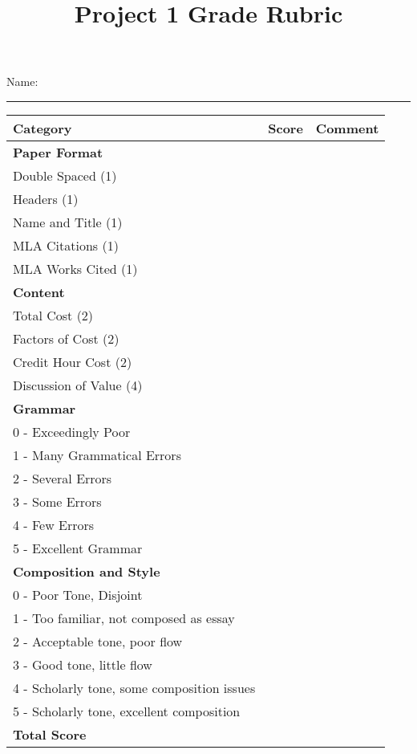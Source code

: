 \documentclass{article}
\title{Project 1 Grade Rubric}
\author{}
\date{}
\begin{document}
    \maketitle

    Name: \rule{5in}{0.25pt}
    \newline
    \newline
    \begin{tabular}{|l|l|l|}
        \hline
        \textbf{Category} & \textbf{Score} & \textbf{Comment} \\
        \hline
        \rule{0in}{0.25in}\textbf{Paper Format} & \hspace{0.25in} & \hspace{3in} \\
        Double Spaced (1) & & \\
        Headers (1) & & \\
        Name and Title (1) & & \\
        MLA Citations (1) & & \\
        MLA Works Cited (1) & & \\
        \hline
        \textbf{Content} & & \\
        Total Cost (2) & & \\
        Factors of Cost (2) & & \\
        Credit Hour Cost (2) & & \\
        Discussion of Value (4) & & \\
        \hline
        \textbf{Grammar} & & \\
        0 - Exceedingly Poor & & \\
        1 - Many Grammatical Errors & & \\
        2 - Several Errors & & \\
        3 - Some Errors & & \\
        4 - Few Errors & & \\
        5 - Excellent Grammar & & \\
        \hline
        \textbf{Composition and Style} & & \\
        0 - Poor Tone, Disjoint & & \\
        1 - Too familiar, not composed as essay & & \\
        2 - Acceptable tone, poor flow & & \\
        3 - Good tone, little flow & & \\
        4 - Scholarly tone, some composition issues & & \\
        5 - Scholarly tone, excellent composition & & \\
        \hline
        \rule{0in}{0.25in}\textbf{Total Score} & & \\
        \hline
    \end{tabular}
\end{document}
